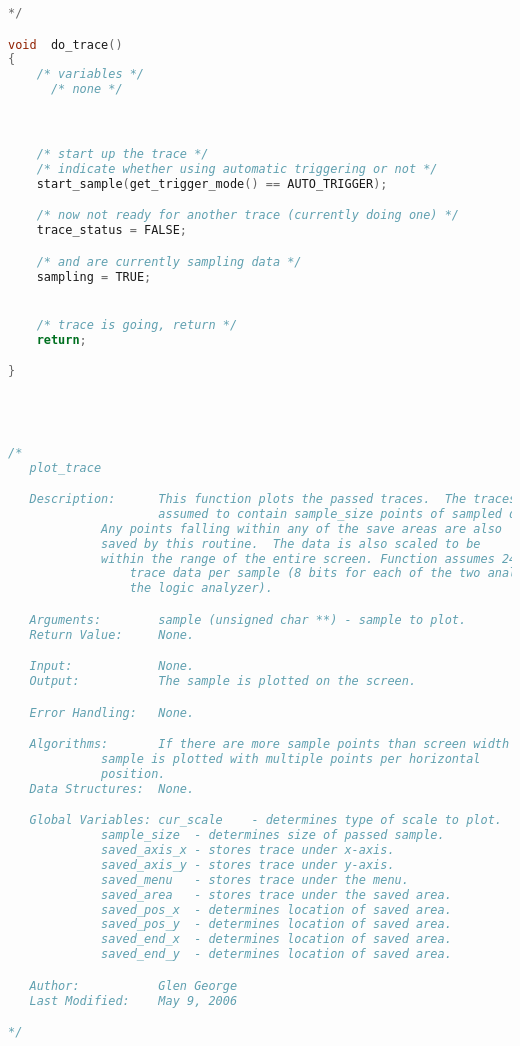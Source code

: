 \begin{lstlisting}[language=C]
*/

void  do_trace()
{
    /* variables */
      /* none */



    /* start up the trace */
    /* indicate whether using automatic triggering or not */
    start_sample(get_trigger_mode() == AUTO_TRIGGER);

    /* now not ready for another trace (currently doing one) */
    trace_status = FALSE;

    /* and are currently sampling data */
    sampling = TRUE;


    /* trace is going, return */
    return;

}




/*
   plot_trace

   Description:      This function plots the passed traces.  The traces are
                     assumed to contain sample_size points of sampled data.
		     Any points falling within any of the save areas are also
		     saved by this routine.  The data is also scaled to be
		     within the range of the entire screen. Function assumes 24-bits of
				 trace data per sample (8 bits for each of the two analog inputs
				 the logic analyzer).

   Arguments:        sample (unsigned char **) - sample to plot.
   Return Value:     None.

   Input:            None.
   Output:           The sample is plotted on the screen.

   Error Handling:   None.

   Algorithms:       If there are more sample points than screen width the
   		     sample is plotted with multiple points per horizontal
		     position.
   Data Structures:  None.

   Global Variables: cur_scale    - determines type of scale to plot.
		     sample_size  - determines size of passed sample.
		     saved_axis_x - stores trace under x-axis.
		     saved_axis_y - stores trace under y-axis.
		     saved_menu   - stores trace under the menu.
		     saved_area   - stores trace under the saved area.
		     saved_pos_x  - determines location of saved area.
		     saved_pos_y  - determines location of saved area.
		     saved_end_x  - determines location of saved area.
		     saved_end_y  - determines location of saved area.

   Author:           Glen George
   Last Modified:    May 9, 2006

*/


\end{lstlisting}
